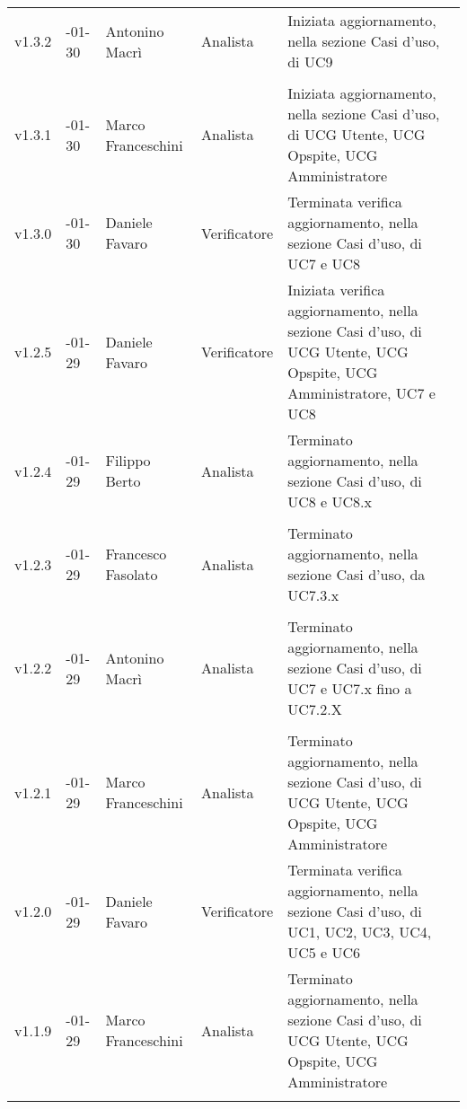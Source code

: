 \begin{longtable} { >{\centering}p{1.4cm} >{\centering}p{2cm} >{\centering}p{2.3cm} >{\centering}p{2.7cm} p{5.5cm} }
		\addlinespace[0.4em]
		\midrule
		\addlinespace[0.4em]
		v1.3.2 & 2017-01-30 & Antonino Macrì & Analista & Iniziata aggiornamento, nella sezione Casi d'uso, di UC9 \\ \\
		\addlinespace[0.4em]
		\midrule
		\addlinespace[0.4em]
		v1.3.1 & 2017-01-30 & Marco Franceschini & Analista & Iniziata aggiornamento, nella sezione Casi d'uso, di UCG Utente, UCG Opspite, UCG Amministratore \\
		\addlinespace[0.4em]
		\midrule
		\addlinespace[0.4em]
		v1.3.0 & 2017-01-30 &  Daniele Favaro & Verificatore & Terminata verifica aggiornamento, nella sezione Casi d'uso, di UC7 e UC8 \\
		\addlinespace[0.4em]
		\midrule
		\addlinespace[0.4em]
		v1.2.5 & 2017-01-29 & Daniele Favaro & Verificatore & Iniziata verifica aggiornamento, nella sezione Casi d'uso, di UCG Utente, UCG Opspite, UCG Amministratore, UC7 e UC8 \\
		\addlinespace[0.4em]
		\midrule
		\addlinespace[0.4em]
		v1.2.4 & 2017-01-29 & Filippo Berto & Analista & Terminato aggiornamento, nella sezione Casi d'uso, di UC8 e UC8.x \\ \\
		\addlinespace[0.4em]
		\midrule
		\addlinespace[0.4em]
		v1.2.3 & 2017-01-29 & Francesco Fasolato & Analista & Terminato aggiornamento, nella sezione Casi d'uso, da UC7.3.x\\ \\
		\addlinespace[0.4em]
		\midrule
		\addlinespace[0.4em]
		v1.2.2 & 2017-01-29 & Antonino Macrì & Analista & Terminato aggiornamento, nella sezione Casi d'uso, di UC7 e UC7.x fino a UC7.2.X \\ \\
		\addlinespace[0.4em]
		\midrule
		\addlinespace[0.4em]
		v1.2.1 & 2017-01-29 & Marco Franceschini & Analista & Terminato aggiornamento, nella sezione Casi d'uso, di UCG Utente, UCG Opspite, UCG Amministratore \\ 
		\addlinespace[0.4em]
		\midrule
		\addlinespace[0.4em]
		v1.2.0 & 2017-01-29 & Daniele Favaro & Verificatore & Terminata verifica aggiornamento, nella sezione Casi d'uso, di UC1, UC2, UC3, UC4, UC5 e UC6 \\
		\addlinespace[0.4em]
		\midrule
		\addlinespace[0.4em]
		v1.1.9 & 2017-01-29 & Marco Franceschini & Analista & Terminato aggiornamento, nella sezione Casi d'uso, di UCG Utente, UCG Opspite, UCG Amministratore \\
		\addlinespace[0.4em]
		\midrule
		\addlinespace[0.4em]

\end{longtable}
